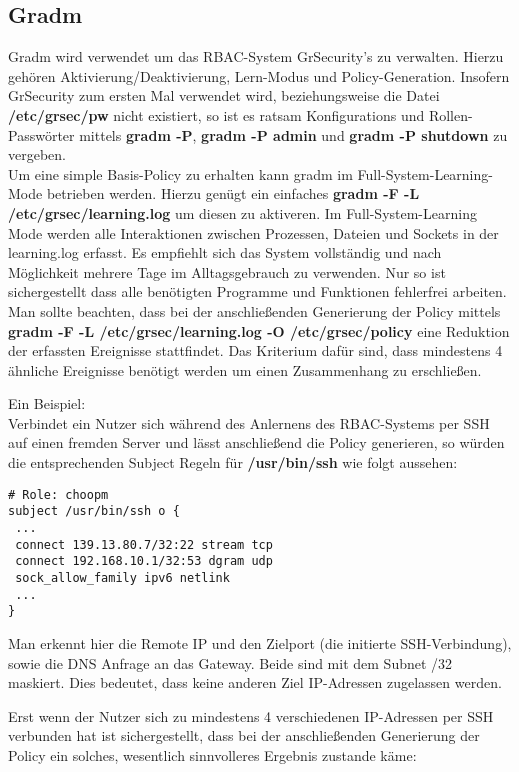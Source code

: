 \subsection{Gradm}
\label{subsec:Gradm}
Gradm wird verwendet um das RBAC-System GrSecurity's zu verwalten. Hierzu gehören Aktivierung/Deaktivierung, Lern-Modus und Policy-Generation. Insofern GrSecurity zum ersten Mal verwendet wird, beziehungsweise die Datei \textbf{/etc/grsec/pw} nicht existiert, so ist es ratsam Konfigurations und Rollen-Passwörter mittels \textbf{gradm -P}, \textbf{gradm -P admin} und \textbf{gradm -P shutdown} zu vergeben.\\
Um eine simple Basis-Policy zu erhalten kann gradm im Full-System-Learning-Mode betrieben werden. Hierzu genügt ein einfaches \textbf{gradm -F -L /etc/grsec/learning.log} um diesen zu aktiveren. Im Full-System-Learning Mode werden alle Interaktionen zwischen Prozessen, Dateien und Sockets in der learning.log erfasst. Es empfiehlt sich das System vollständig und nach Möglichkeit mehrere Tage im Alltagsgebrauch zu verwenden. Nur so ist sichergestellt dass alle benötigten Programme und Funktionen fehlerfrei arbeiten.\\
Man sollte beachten, dass bei der anschließenden Generierung der Policy mittels \textbf{gradm -F -L /etc/grsec/learning.log -O /etc/grsec/policy} eine Reduktion der erfassten Ereignisse stattfindet. Das Kriterium dafür sind, dass mindestens 4 ähnliche Ereignisse benötigt werden um einen Zusammenhang zu erschließen.

Ein Beispiel:\\
Verbindet ein Nutzer sich während des Anlernens des RBAC-Systems per SSH auf einen fremden Server und lässt anschließend die Policy generieren, so würden die entsprechenden Subject Regeln für \textbf{/usr/bin/ssh} wie folgt aussehen:

\begin{lstlisting}[numbers=none, frame=single, lineskip={-2.5pt}, breaklines=true]
# Role: choopm
subject /usr/bin/ssh o {
 ...
 connect 139.13.80.7/32:22 stream tcp
 connect 192.168.10.1/32:53 dgram udp
 sock_allow_family ipv6 netlink
 ...
}
\end{lstlisting}

Man erkennt hier die Remote IP und den Zielport (die initierte SSH-Verbindung), sowie die DNS Anfrage an das Gateway. Beide sind mit dem Subnet /32 maskiert. Dies bedeutet, dass keine anderen Ziel IP-Adressen zugelassen werden.

Erst wenn der Nutzer sich zu mindestens 4 verschiedenen IP-Adressen per SSH verbunden hat ist sichergestellt, dass bei der anschließenden Generierung der Policy ein solches, wesentlich sinnvolleres Ergebnis zustande käme:


